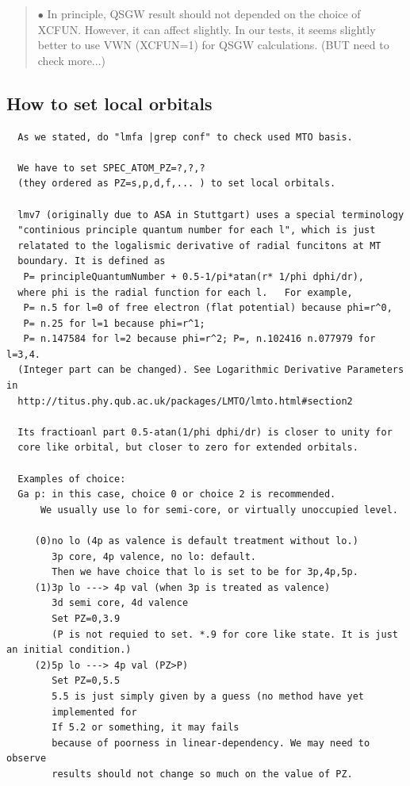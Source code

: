 \documentclass[a4paper,10pt,epsf,fleqn]{article}
\begin{document}
{\begin{quote}
$\bullet$ In principle, QSGW result should not depended on the choice of XCFUN.
However, it can affect slightly. In our tests, it seems slightly better
to use VWN (XCFUN=1) for QSGW calculations. (BUT need to check more...)

\end{quote}


\subsection{How to set local orbitals}
\begin{verbatim}
  As we stated, do "lmfa |grep conf" to check used MTO basis. 

  We have to set SPEC_ATOM_PZ=?,?,? 
  (they ordered as PZ=s,p,d,f,... ) to set local orbitals.
  
  lmv7 (originally due to ASA in Stuttgart) uses a special terminology
  "continious principle quantum number for each l", which is just
  relatated to the logalismic derivative of radial funcitons at MT
  boundary. It is defined as
   P= principleQuantumNumber + 0.5-1/pi*atan(r* 1/phi dphi/dr),
  where phi is the radial function for each l.   For example, 
   P= n.5 for l=0 of free electron (flat potential) because phi=r^0,
   P= n.25 for l=1 because phi=r^1; 
   P= n.147584 for l=2 because phi=r^2; P=, n.102416 n.077979 for l=3,4.
  (Integer part can be changed). See Logarithmic Derivative Parameters in
  http://titus.phy.qub.ac.uk/packages/LMTO/lmto.html#section2

  Its fractioanl part 0.5-atan(1/phi dphi/dr) is closer to unity for
  core like orbital, but closer to zero for extended orbitals.

  Examples of choice:
  Ga p: in this case, choice 0 or choice 2 is recommended.
      We usually use lo for semi-core, or virtually unoccupied level.

     (0)no lo (4p as valence is default treatment without lo.)
        3p core, 4p valence, no lo: default.
        Then we have choice that lo is set to be for 3p,4p,5p.
     (1)3p lo ---> 4p val (when 3p is treated as valence)
        3d semi core, 4d valence  
        Set PZ=0,3.9 
        (P is not requied to set. *.9 for core like state. It is just an initial condition.)
     (2)5p lo ---> 4p val (PZ>P)
        Set PZ=0,5.5 
        5.5 is just simply given by a guess (no method have yet
		implemented for 
        If 5.2 or something, it may fails
        because of poorness in linear-dependency. We may need to observe
        results should not change so much on the value of PZ.


\end{verbatim}}
\end{document}
